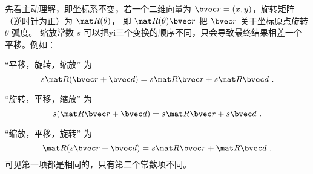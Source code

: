 

先看主动理解，即坐标系不变，若一个二维向量为 $\bvec r = (x, y)$，旋转矩阵（逆时针为正）为 $\mat R(\theta)$， 即 $\mat R(\theta)\bvec r$ 把 $\bvec r$ 关于坐标原点旋转 $\theta$ 弧度。 缩放常数 $s$ 可以把yi三个变换的顺序不同，只会导致最终结果相差一个平移。例如：

“平移，旋转，缩放” 为
\begin{equation}
s\mat R (\bvec r + \bvec d) = s\mat R\bvec r + s\mat R\bvec d~.
\end{equation}

“旋转，平移，缩放” 为
\begin{equation}
s(\mat R\bvec r + \bvec d) = s\mat R\bvec r + s\bvec d~.
\end{equation}

“缩放，平移，旋转” 为
\begin{equation}
\mat R(s\bvec r + \bvec d) = s\mat R\bvec r + \mat R\bvec d~.
\end{equation}
可见第一项都是相同的，只有第二个常数项不同。

